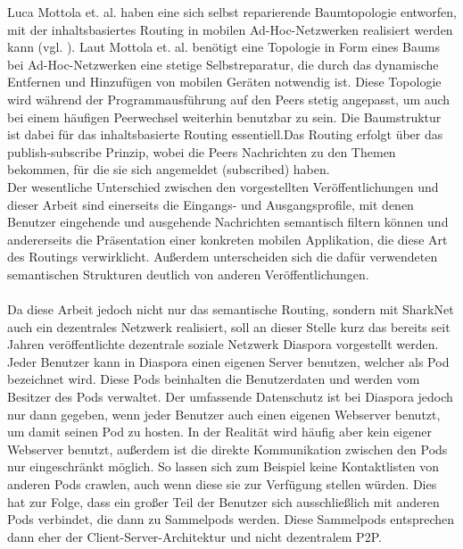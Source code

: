 Luca Mottola et. al. haben eine sich selbst reparierende Baumtopologie entworfen, mit der inhaltsbasiertes Routing in mobilen Ad-Hoc-Netzwerken realisiert werden kann (vgl. \citet[S. 946ff]{Mottola2008}). Laut Mottola et. al. benötigt eine Topologie in Form eines Baums bei Ad-Hoc-Netzwerken eine stetige Selbstreparatur, die durch das dynamische Entfernen und Hinzufügen von mobilen Geräten notwendig ist. Diese Topologie wird während der Programmausführung auf den Peers stetig angepasst, um auch bei einem häufigen Peerwechsel weiterhin benutzbar zu sein. Die Baumstruktur ist dabei für das inhaltsbasierte Routing essentiell.\newpage Das Routing erfolgt über das publish-subscribe Prinzip, wobei die Peers Nachrichten zu den Themen bekommen, für die sie sich angemeldet (subscribed) haben. 
\\Der wesentliche Unterschied zwischen den vorgestellten Veröffentlichungen und dieser Arbeit sind einerseits die Eingangs- und Ausgangsprofile, mit denen Benutzer eingehende und ausgehende Nachrichten semantisch filtern können und andererseits die Präsentation einer konkreten mobilen Applikation, die diese Art des Routings verwirklicht. Außerdem unterscheiden sich die dafür verwendeten semantischen Strukturen deutlich von anderen Veröffentlichungen.\\\\
Da diese Arbeit jedoch nicht nur das semantische Routing, sondern mit SharkNet auch ein dezentrales Netzwerk realisiert, soll an dieser Stelle kurz das bereits seit Jahren veröffentlichte dezentrale soziale Netzwerk Diaspora vorgestellt werden.\\
Jeder Benutzer kann in Diaspora einen eigenen Server benutzen, welcher als Pod bezeichnet wird. Diese Pods beinhalten die Benutzerdaten und werden vom Besitzer des Pods verwaltet. Der umfassende Datenschutz ist bei Diaspora jedoch nur dann gegeben, wenn jeder Benutzer auch einen eigenen Webserver benutzt, um damit seinen Pod zu hosten. In der Realität wird häufig aber kein eigener Webserver benutzt, außerdem ist die direkte Kommunikation zwischen den Pods nur eingeschränkt möglich. So lassen sich zum Beispiel keine Kontaktlisten von anderen Pods crawlen, auch wenn diese sie zur Verfügung stellen würden. Dies hat zur Folge, dass ein großer Teil der Benutzer sich ausschließlich mit anderen Pods verbindet, die dann zu Sammelpods werden. Diese Sammelpods entsprechen dann eher der Client-Server-Architektur und nicht dezentralem P2P.
\newpage

